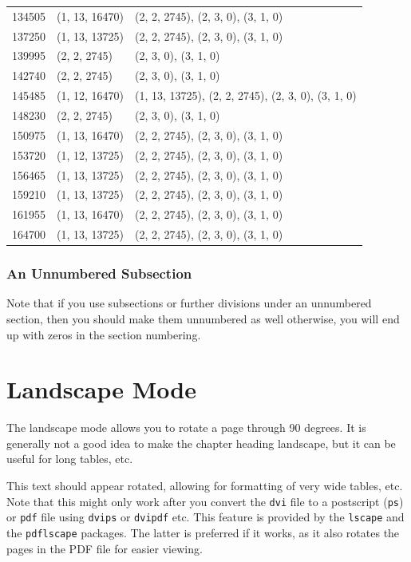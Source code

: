 \documentclass[msc,oneside]{ubcthesis}
\theoremstyle{definition}
\begin{document}
\begin{center}
\begin{longtable}{|l|l|l|}
    134505 & (1, 13, 16470) & (2, 2, 2745), (2, 3, 0), (3, 1, 0) \\
    137250 & (1, 13, 13725) & (2, 2, 2745), (2, 3, 0), (3, 1, 0) \\
    139995 & (2, 2, 2745) & (2, 3, 0), (3, 1, 0) \\
    142740 & (2, 2, 2745) & (2, 3, 0), (3, 1, 0) \\
    145485 & (1, 12, 16470) & (1, 13, 13725), (2, 2, 2745), (2, 3, 0), (3, 1, 0) \\
    148230 & (2, 2, 2745) & (2, 3, 0), (3, 1, 0) \\
    150975 & (1, 13, 16470) & (2, 2, 2745), (2, 3, 0), (3, 1, 0) \\
    153720 & (1, 12, 13725) & (2, 2, 2745), (2, 3, 0), (3, 1, 0) \\
    156465 & (1, 13, 13725) & (2, 2, 2745), (2, 3, 0), (3, 1, 0) \\
    159210 & (1, 13, 13725) & (2, 2, 2745), (2, 3, 0), (3, 1, 0) \\
    161955 & (1, 13, 16470) & (2, 2, 2745), (2, 3, 0), (3, 1, 0) \\
    164700 & (1, 13, 13725) & (2, 2, 2745), (2, 3, 0), (3, 1, 0) \\
\end{longtable}
\end{center}

\subsection*{An Unnumbered Subsection}
Note that if you use subsections or further divisions under an
unnumbered section, then you should make them unnumbered as well
otherwise, you will end up with zeros in the section numbering.

\chapter{Landscape Mode}
The landscape mode allows you to rotate a page through 90 degrees.  It
is generally not a good idea to make the chapter heading landscape,
but it can be useful for long tables, etc.

\begin{landscape}
  This text should appear rotated, allowing for formatting of very
  wide tables, etc.  Note that this might only work after you convert
  the \texttt{dvi} file to a postscript (\texttt{ps}) or \texttt{pdf}
  file using \texttt{dvips} or \texttt{dvipdf} etc.  This feature is
  provided by the \verb|lscape| and the \verb|pdflscape| packages.
  The latter is preferred if it works, as it also rotates the pages in
  the PDF file for easier viewing.
\end{landscape}
\end{document}
